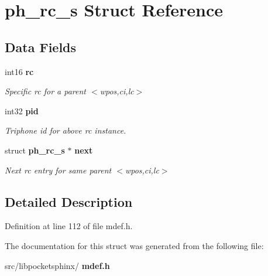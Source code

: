\section{ph\+\_\+rc\+\_\+s Struct Reference}
\label{structph__rc__s}
\subsection*{Data Fields}
\begin{DoxyCompactItemize}
\item 
\mbox{\label{structph__rc__s_ab0f0852e254c04a1cb11de805b698733}} 
int16 \textbf{ rc}
\begin{DoxyCompactList}\small\item\em Specific rc for a parent $<$wpos,ci,lc$>$ \end{DoxyCompactList}\item 
\mbox{\label{structph__rc__s_a9762d0f7b4b9f284fd2b3ff735b4256b}} 
int32 \textbf{ pid}
\begin{DoxyCompactList}\small\item\em Triphone id for above rc instance. \end{DoxyCompactList}\item 
\mbox{\label{structph__rc__s_ae05aead721c5cfdd27ac90378bb80f3c}} 
struct \textbf{ ph\+\_\+rc\+\_\+s} $\ast$ \textbf{ next}
\begin{DoxyCompactList}\small\item\em Next rc entry for same parent $<$wpos,ci,lc$>$ \end{DoxyCompactList}\end{DoxyCompactItemize}


\subsection{Detailed Description}


Definition at line 112 of file mdef.\+h.



The documentation for this struct was generated from the following file\+:\begin{DoxyCompactItemize}
\item 
src/libpocketsphinx/\textbf{ mdef.\+h}\end{DoxyCompactItemize}
